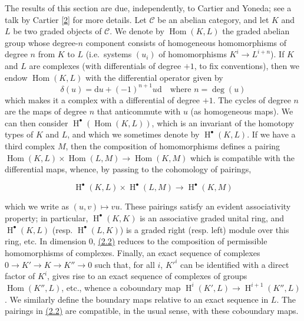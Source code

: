 \documentclass{article}
\newenvironment{eqenv}
  {}
  {}
\theoremstyle{definition}
\theoremstyle{definition}
\theoremstyle{definition}
\theoremstyle{definition}
\theoremstyle{remark}
\begin{document}
The results of this section are due, independently, to Cartier and Yoneda;
see a talk by Cartier {[}\protect\hyperlink{ref-Car1957}{2}{]} for more details.
Let \({\mathcal{C}}\) be an abelian category, and let \(K\) and \(L\) be two graded objects of \({\mathcal{C}}\).
We denote by \(\operatorname{Hom}(K,L)\) the graded abelian group whose degree-\(n\) component consists of homogeneous homomorphisms of degree \(n\) from \(K\) to \(L\) (i.e.~systems \((u_i)\) of homomorphisms \(K^i\to L^{i+n}\)).
If \(K\) and \(L\) are complexes (with differentials of degree \(+1\), to fix conventions), then we endow \(\operatorname{Hom}(K,L)\) with the differential operator given by
\[
  \delta(u) = \mathrm{d}u + (-1)^{n+1}u\mathrm{d}
  \quad\text{where }n=\deg(u)
\tag{2.1}
\]
which makes it a complex with a differential of degree \(+1\).
The cycles of degree \(n\) are the maps of degree \(n\) that anticommute with \(u\) (as homogeneous maps).
We can then consider \(\operatorname{H}^\bullet(\operatorname{Hom}(K,L))\), which is an invariant of the homotopy types of \(K\) and \(L\), and which we sometimes denote by \(\operatorname{H}^\bullet(K,L)\).
If we have a third complex \(M\), then the composition of homomorphisms defines a pairing \(\operatorname{Hom}(K,L)\times\operatorname{Hom}(L,M)\to\operatorname{Hom}(K,M)\) which is compatible with the differential maps, whence, by passing to the cohomology of pairings,

\leavevmode{}%
\begin{eqenv}
\[
  \operatorname{H}^\bullet(K,L)\times\operatorname{H}^\bullet(L,M) \to \operatorname{H}^\bullet(K,M)
\tag{2.2}
\]

\end{eqenv}

which we write as \((u,v)\mapsto vu\).
These pairings satisfy an evident associativity property;
in particular, \(\operatorname{H}^\bullet(K,K)\) is an associative graded unital ring, and \(\operatorname{H}^\bullet(K,L)\) (resp. \(\operatorname{H}^\bullet(L,K)\)) is a graded right (resp. left) module over this ring, etc.
In dimension \(0\), \protect\hyperlink{fga-1-equation-2.2}{(2.2)} reduces to the composition of permissible homomorphisms of complexes.
Finally, an exact sequence of complexes \(0\to K'\to K\to K''\to0\) such that, for all \(i\), \(K'^i\) can be identified with a direct factor of \(K^i\), gives rise to an exact sequence of complexes of groups \(\operatorname{Hom}(K'',L)\), etc., whence a coboundary map \(\operatorname{H}^i(K',L)\to\operatorname{H}^{i+1}(K'',L)\).
We similarly define the boundary maps relative to an exact sequence in \(L\).
The pairings in \protect\hyperlink{fga-1-equation-2.2}{(2.2)} are compatible, in the usual sense, with these coboundary maps.
\end{document}
